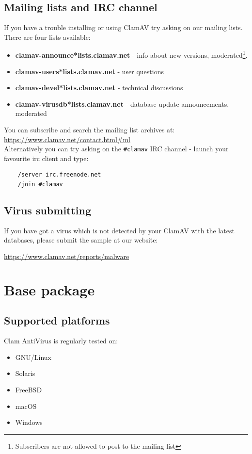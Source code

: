 \documentclass[a4paper,titlepage,12pt]{article}
\begin{document}
    \subsection{Mailing lists and IRC channel}
    If you have a trouble installing or using ClamAV try asking on our mailing
    lists. There are four lists available:
    \begin{itemize}
    \item \textbf{clamav-announce*lists.clamav.net} - info about new versions,
    moderated\footnote{Subscribers are not allowed to post to the mailing
    list}.
    \item \textbf{clamav-users*lists.clamav.net} - user questions
    \item \textbf{clamav-devel*lists.clamav.net} - technical discussions
    \item \textbf{clamav-virusdb*lists.clamav.net} - database update announcements, moderated
    \end{itemize}
    \noindent You can subscribe and search the mailing list archives at: 
    \url{https://www.clamav.net/contact.html#ml}\\
    Alternatively you can try asking on the \verb+#clamav+ IRC channel - launch
    your favourite irc client and type:
    \begin{verbatim}
	/server irc.freenode.net
	/join #clamav
    \end{verbatim}

    \subsection{Virus submitting}
    If you have got a virus which is not detected by your ClamAV with the latest
    databases, please submit the sample at our website:
    \begin{center}
	\url{https://www.clamav.net/reports/malware}
    \end{center}

    \section{Base package}

    \subsection{Supported platforms}
	Clam AntiVirus is regularly tested on:
	\begin{itemize}
	    \item{GNU/Linux}
	    \item{Solaris}
	    \item{FreeBSD}
	    \item{macOS}
	    \item{Windows}
	\end{itemize}
\end{document}
